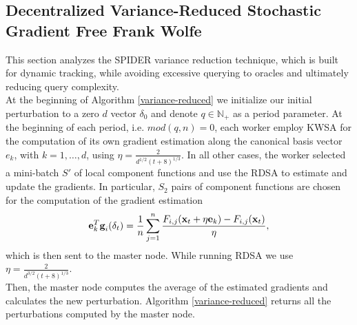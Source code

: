 \subsection{Decentralized Variance-Reduced Stochastic Gradient Free Frank Wolfe}
This section analyzes the SPIDER variance reduction technique, which is built for dynamic tracking, while avoiding excessive querying to oracles and ultimately reducing query complexity.\\
At the beginning of Algorithm \ref{variance-reduced} we initialize our initial perturbation to a zero $d$ vector \boldmath$\delta_0$ and denote $q \in \mathbb{N}_{+}$ as a period parameter. At the beginning of each period, i.e. $mod(q,n)=0$, each worker employ KWSA for the computation of its own gradient estimation along the canonical basis vector $e_k$, with $k=1, \dots, d$, using $\eta = \frac{2}{d^{1/2}(t+8)^{1/3}}$. In all other cases, the worker selected a mini-batch $ S'$ of local component functions and use the RDSA to estimate and update the gradients. In particular, $S_2$ pairs of component functions are chosen for the computation of the gradient estimation
\[\textbf{e}_k^T\textbf{g}_i(\text{\boldmath} \delta_t) = \frac{1}{n}\sum_{j=1}^{n}\frac{F_{i,j}(\textbf{x}_t + \eta\textbf{e}_k) - F_{i,j}(\textbf{x}_t) }{\eta},\]
which is then sent to the master node. While running RDSA we use $\eta = \frac{2}{d^{3/2}(t+8)^{1/3}}$.\\
Then, the master node computes the average of the estimated gradients and calculates the new perturbation. Algorithm \ref{variance-reduced} returns all the perturbations computed by the master node.
